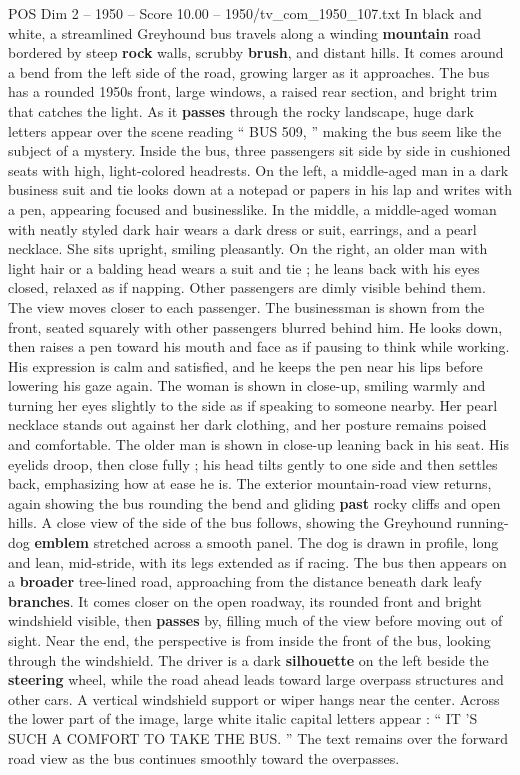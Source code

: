 \begin{textsample}{POS Dim 2 – 1950 – Score 10.00 – 1950/tv\_com\_1950\_107.txt}  \label{ex:f2_pos_090}
In black and white, a streamlined Greyhound bus travels along a winding \textbf{mountain} road bordered by steep \textbf{rock} walls, scrubby \textbf{brush}, and distant hills.
It comes around a bend from the left side of the road, growing larger as it approaches.
The bus has a rounded 1950s front, large windows, a raised rear section, and bright trim that catches the light.
As it \textbf{passes} through the rocky landscape, huge dark letters appear over the scene reading “ BUS 509, ” making the bus seem like the subject of a mystery.
Inside the bus, three passengers sit side by side in cushioned seats with high, light-colored headrests.
On the left, a middle-aged man in a dark business suit and tie looks down at a notepad or papers in his lap and writes with a pen, appearing focused and businesslike.
In the middle, a middle-aged woman with neatly styled dark hair wears a dark dress or suit, earrings, and a pearl necklace.
She sits upright, smiling pleasantly.
On the right, an older man with light hair or a balding head wears a suit and tie ; he leans back with his eyes closed, relaxed as if napping.
Other passengers are dimly visible behind them.
The view moves closer to each passenger.
The businessman is shown from the front, seated squarely with other passengers blurred behind him.
He looks down, then raises a pen toward his mouth and face as if pausing to think while working.
His expression is calm and satisfied, and he keeps the pen near his lips before lowering his gaze again.
The woman is shown in close-up, smiling warmly and turning her eyes slightly to the side as if speaking to someone nearby.
Her pearl necklace stands out against her dark clothing, and her posture remains poised and comfortable.
The older man is shown in close-up leaning back in his seat.
His eyelids droop, then close fully ; his head tilts gently to one side and then settles back, emphasizing how at ease he is.
The exterior mountain-road view returns, again showing the bus rounding the bend and gliding \textbf{past} rocky cliffs and open hills.
A close view of the side of the bus follows, showing the Greyhound running-dog \textbf{emblem} stretched across a smooth panel.
The dog is drawn in profile, long and lean, mid-stride, with its legs extended as if racing.
The bus then appears on a \textbf{broader} tree-lined road, approaching from the distance beneath dark leafy \textbf{branches}.
It comes closer on the open roadway, its rounded front and bright windshield visible, then \textbf{passes} by, filling much of the view before moving out of sight.
Near the end, the perspective is from inside the front of the bus, looking through the windshield.
The driver is a dark \textbf{silhouette} on the left beside the \textbf{steering} wheel, while the road ahead leads toward large overpass structures and other cars.
A vertical windshield support or wiper hangs near the center.
Across the lower part of the image, large white italic capital letters appear : “ IT ’S SUCH A COMFORT TO TAKE THE BUS. ” The text remains over the forward road view as the bus continues smoothly toward the overpasses.

\end{textsample}
